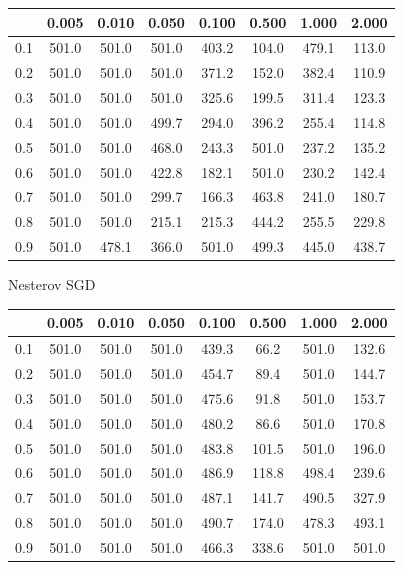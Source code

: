 \documentclass[a4paper,14pt,oneside,openany]{memoir}
\begin{document}
	\begin{tabular}{|c|c|c|c|c|c|c|c|}
	\hline 
	 &0.005 &0.010 &0.050 &0.100 &0.500 &1.000 &2.000 \\
	 \hline 
	0.1 &501.0 &501.0 &501.0 &403.2 &104.0 &479.1 &113.0 \\
	 \hline 
	0.2 &501.0 &501.0 &501.0 &371.2 &152.0 &382.4 &110.9 \\
	 \hline 
	0.3 &501.0 &501.0 &501.0 &325.6 &199.5 &311.4 &123.3 \\
	 \hline 
	0.4 &501.0 &501.0 &499.7 &294.0 &396.2 &255.4 &114.8 \\
	 \hline 
	0.5 &501.0 &501.0 &468.0 &243.3 &501.0 &237.2 &135.2 \\
	 \hline 
	0.6 &501.0 &501.0 &422.8 &182.1 &501.0 &230.2 &142.4 \\
	 \hline 
	0.7 &501.0 &501.0 &299.7 &166.3 &463.8 &241.0 &180.7 \\
	 \hline 
	0.8 &501.0 &501.0 &215.1 &215.3 &444.2 &255.5 &229.8 \\
	 \hline 
	0.9 &501.0 &478.1 &366.0 &501.0 &499.3 &445.0 &438.7 \\
	 \hline 
	
	\end{tabular}
	
	Nesterov SGD 
	
	\begin{tabular}{|c|c|c|c|c|c|c|c|}
	\hline 
	 &0.005 &0.010 &0.050 &0.100 &0.500 &1.000 &2.000 \\
	 \hline 
	0.1 &501.0 &501.0 &501.0 &439.3 &66.2 &501.0 &132.6 \\
	 \hline 
	0.2 &501.0 &501.0 &501.0 &454.7 &89.4 &501.0 &144.7 \\
	 \hline 
	0.3 &501.0 &501.0 &501.0 &475.6 &91.8 &501.0 &153.7 \\
	 \hline 
	0.4 &501.0 &501.0 &501.0 &480.2 &86.6 &501.0 &170.8 \\
	 \hline 
	0.5 &501.0 &501.0 &501.0 &483.8 &101.5 &501.0 &196.0 \\
	 \hline 
	0.6 &501.0 &501.0 &501.0 &486.9 &118.8 &498.4 &239.6 \\
	 \hline 
	0.7 &501.0 &501.0 &501.0 &487.1 &141.7 &490.5 &327.9 \\
	 \hline 
	0.8 &501.0 &501.0 &501.0 &490.7 &174.0 &478.3 &493.1 \\
	 \hline 
	0.9 &501.0 &501.0 &501.0 &466.3 &338.6 &501.0 &501.0 \\
	 \hline 
	
	\end{tabular}
	
\end{document}
